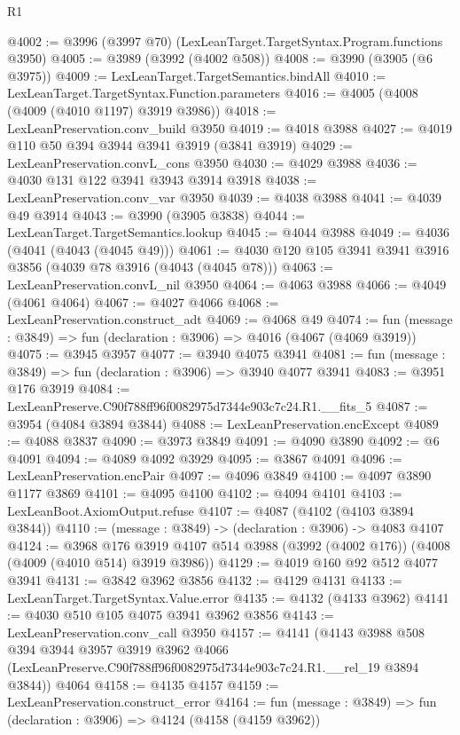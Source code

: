 \begin{lexlean}{R1}
\begin{coremodule}
@4002 := @3996 (@3997 @70) (LexLeanTarget.TargetSyntax.Program.functions @3950)
@4005 := @3989 (@3992 (@4002 @508))
@4008 := @3990 (@3905 (@6 @3975))
@4009 := LexLeanTarget.TargetSemantics.bindAll
@4010 := LexLeanTarget.TargetSyntax.Function.parameters
@4016 := @4005 (@4008 (@4009 (@4010 @1197) @3919 @3986))
@4018 := LexLeanPreservation.conv_build @3950
@4019 := @4018 @3988
@4027 := @4019 @110 @50 @394 @3944 @3941 @3919 (@3841 @3919)
@4029 := LexLeanPreservation.convL_cons @3950
@4030 := @4029 @3988
@4036 := @4030 @131 @122 @3941 @3943 @3914 @3918
@4038 := LexLeanPreservation.conv_var @3950
@4039 := @4038 @3988
@4041 := @4039 @49 @3914
@4043 := @3990 (@3905 @3838)
@4044 := LexLeanTarget.TargetSemantics.lookup
@4045 := @4044 @3988
@4049 := @4036 (@4041 (@4043 (@4045 @49)))
@4061 := @4030 @120 @105 @3941 @3941 @3916 @3856 (@4039 @78 @3916 (@4043 (@4045 @78)))
@4063 := LexLeanPreservation.convL_nil @3950
@4064 := @4063 @3988
@4066 := @4049 (@4061 @4064)
@4067 := @4027 @4066
@4068 := LexLeanPreservation.construct_adt
@4069 := @4068 @49
@4074 := fun (message : @3849) => fun (declaration : @3906) => @4016 (@4067 (@4069 @3919))
@4075 := @3945 @3957
@4077 := @3940 @4075 @3941
@4081 := fun (message : @3849) => fun (declaration : @3906) => @3940 @4077 @3941
@4083 := @3951 @176 @3919
@4084 := LexLeanPreserve.C90f788ff96f0082975d7344e903c7c24.R1.__fits_5
@4087 := @3954 (@4084 @3894 @3844)
@4088 := LexLeanPreservation.encExcept
@4089 := @4088 @3837
@4090 := @3973 @3849
@4091 := @4090 @3890
@4092 := @6 @4091
@4094 := @4089 @4092 @3929
@4095 := @3867 @4091
@4096 := LexLeanPreservation.encPair
@4097 := @4096 @3849
@4100 := @4097 @3890 @1177 @3869
@4101 := @4095 @4100
@4102 := @4094 @4101
@4103 := LexLeanBoot.AxiomOutput.refuse
@4107 := @4087 (@4102 (@4103 @3894 @3844))
@4110 := (message : @3849) -> (declaration : @3906) -> @4083 @4107
@4124 := @3968
    @176
    @3919
    @4107
    @514
    @3988
    (@3992 (@4002 @176))
    (@4008 (@4009 (@4010 @514) @3919 @3986))
@4129 := @4019 @160 @92 @512 @4077 @3941
@4131 := @3842 @3962 @3856
@4132 := @4129 @4131
@4133 := LexLeanTarget.TargetSyntax.Value.error
@4135 := @4132 (@4133 @3962)
@4141 := @4030 @510 @105 @4075 @3941 @3962 @3856
@4143 := LexLeanPreservation.conv_call @3950
@4157 := @4141
    (@4143
      @3988
      @508
      @394
      @3944
      @3957
      @3919
      @3962
      @4066
      (LexLeanPreserve.C90f788ff96f0082975d7344e903c7c24.R1.__rel_19 @3894 @3844))
    @4064
@4158 := @4135 @4157
@4159 := LexLeanPreservation.construct_error
@4164 := fun (message : @3849) => fun (declaration : @3906) => @4124 (@4158 (@4159 @3962))

\end{coremodule}
\end{lexlean}
